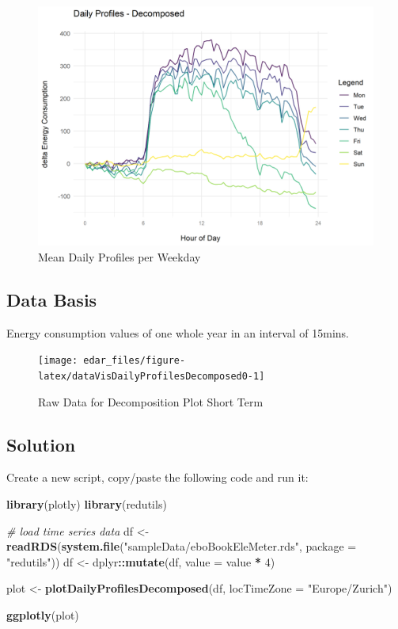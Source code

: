 \documentclass[
  a4paperpaper,
]{book}
\newenvironment{Shaded}{\begin{snugshade}}{\end{snugshade}}
\newcommand{\CommentTok}[1]{\textcolor[rgb]{0.56,0.35,0.01}{\textit{#1}}}
\newcommand{\DataTypeTok}[1]{\textcolor[rgb]{0.13,0.29,0.53}{#1}}
\newcommand{\DecValTok}[1]{\textcolor[rgb]{0.00,0.00,0.81}{#1}}
\newcommand{\KeywordTok}[1]{\textcolor[rgb]{0.13,0.29,0.53}{\textbf{#1}}}
\newcommand{\NormalTok}[1]{#1}
\newcommand{\OperatorTok}[1]{\textcolor[rgb]{0.81,0.36,0.00}{\textbf{#1}}}
\newcommand{\StringTok}[1]{\textcolor[rgb]{0.31,0.60,0.02}{#1}}
\let\oldShaded\Shaded
\let\endoldShaded\endShaded
\renewenvironment{Shaded}{\footnotesize\oldShaded}{\endoldShaded}
\begin{document}
\begin{figure}
\includegraphics[width=0.7\linewidth]{images/plotDailyProfDecomposed} \caption{Mean Daily Profiles per Weekday}\label{fig:unnamed-chunk-25}
\end{figure}

\hypertarget{data-basis-15}{%
\subsection{Data Basis}\label{data-basis-15}}

Energy consumption values of one whole year in an interval of 15mins.

\begin{figure}
\texttt{[image: edar\_files/figure-latex/dataVisDailyProfilesDecomposed0-1]} \caption{Raw Data for Decomposition Plot Short Term}\label{fig:dataVisDailyProfilesDecomposed0}
\end{figure}

\newpage

\hypertarget{solution-15}{%
\subsection{Solution}\label{solution-15}}

Create a new script, copy/paste the following code and run it:

\begin{Shaded}
\begin{Highlighting}[]
\KeywordTok{library}\NormalTok{(plotly)}
\KeywordTok{library}\NormalTok{(redutils)}

\CommentTok{# load time series data}
\NormalTok{df <-}\StringTok{ }\KeywordTok{readRDS}\NormalTok{(}\KeywordTok{system.file}\NormalTok{(}\StringTok{"sampleData/eboBookEleMeter.rds"}\NormalTok{, }\DataTypeTok{package =} \StringTok{"redutils"}\NormalTok{))}
\NormalTok{df <-}\StringTok{ }\NormalTok{dplyr}\OperatorTok{::}\KeywordTok{mutate}\NormalTok{(df, }\DataTypeTok{value =}\NormalTok{ value }\OperatorTok{*}\StringTok{ }\DecValTok{4}\NormalTok{)}

\NormalTok{plot <-}\StringTok{ }\KeywordTok{plotDailyProfilesDecomposed}\NormalTok{(df, }\DataTypeTok{locTimeZone =} \StringTok{"Europe/Zurich"}\NormalTok{)}

\KeywordTok{ggplotly}\NormalTok{(plot)}
\end{Highlighting}
\end{Shaded}
\end{document}
